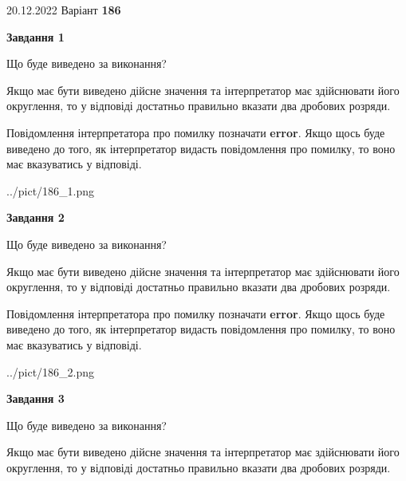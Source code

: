 \documentclass[12pt, ukrainian]{article}
\begin{document}
{20.12.2022 Варіант \No \textbf { 186 }\par}
{
\begin {Large}

{\begin {center}\textbf{Завдання 1}\end {center}}\par
Що буде виведено за виконання? \par

Якщо має бути виведено дійсне значення та інтерпретатор має здійснювати його округлення, 
то у відповіді достатньо правильно вказати два дробових розряди.

Повідомлення інтерпретатора про помилку позначати \textbf{error}.
Якщо щось буде виведено до того, як інтерпретатор видасть повідомлення про помилку, 
то воно має вказуватись у відповіді. \par

\begin{center}
	{../pict/186_1.png}
\end{center}
\newpage

{\begin {center}\textbf{Завдання 2}\end {center}}\par
Що буде виведено за виконання? \par

Якщо має бути виведено дійсне значення та інтерпретатор має здійснювати його округлення, 
то у відповіді достатньо правильно вказати два дробових розряди.

Повідомлення інтерпретатора про помилку позначати \textbf{error}.
Якщо щось буде виведено до того, як інтерпретатор видасть повідомлення про помилку, 
то воно має вказуватись у відповіді. \par

\begin{center}
	{../pict/186_2.png}
\end{center}
\newpage

{\begin {center}\textbf{Завдання 3}\end {center}}\par
Що буде виведено за виконання? \par

Якщо має бути виведено дійсне значення та інтерпретатор має здійснювати його округлення, 
то у відповіді достатньо правильно вказати два дробових розряди.


\end{Large}}
\end{document}
